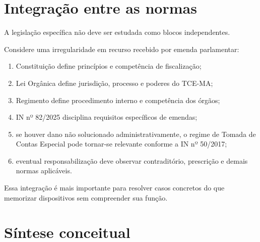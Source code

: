 
\section{Integração entre as normas}

A legislação específica não deve ser estudada como blocos independentes.

Considere uma irregularidade em recurso recebido por emenda parlamentar:
\begin{enumerate}
\item Constituição define princípios e competência de fiscalização;
\item Lei Orgânica define jurisdição, processo e poderes do TCE-MA;
\item Regimento define procedimento interno e competência dos órgãos;
\item IN nº 82/2025 disciplina requisitos específicos de emendas;
\item se houver dano não solucionado administrativamente, o regime de Tomada de Contas Especial pode tornar-se relevante conforme a IN nº 50/2017;
\item eventual responsabilização deve observar contraditório, prescrição e demais normas aplicáveis.
\end{enumerate}

Essa integração é mais importante para resolver casos concretos do que memorizar dispositivos sem compreender sua função.

\section{Síntese conceitual}

